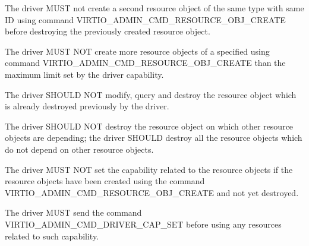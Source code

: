 The driver MUST not create a second resource object of the same type with same
ID using command VIRTIO_ADMIN_CMD_RESOURCE_OBJ_CREATE before destroying the
previously created resource object.

The driver MUST NOT create more resource objects of a specified  using
command VIRTIO_ADMIN_CMD_RESOURCE_OBJ_CREATE than the maximum limit set by the
driver capability.

The driver SHOULD NOT modify, query and destroy the resource object which is
already destroyed previously by the driver.

The driver SHOULD NOT destroy the resource object on which other resource objects
are depending; the driver SHOULD destroy all the resource objects which do not depend
on other resource objects.

The driver MUST NOT set the capability related to the resource objects if the
resource objects have been created using the command VIRTIO_ADMIN_CMD_RESOURCE_OBJ_CREATE
and not yet destroyed.

The driver MUST send the command VIRTIO_ADMIN_CMD_DRIVER_CAP_SET before using
any resources related to such capability.
